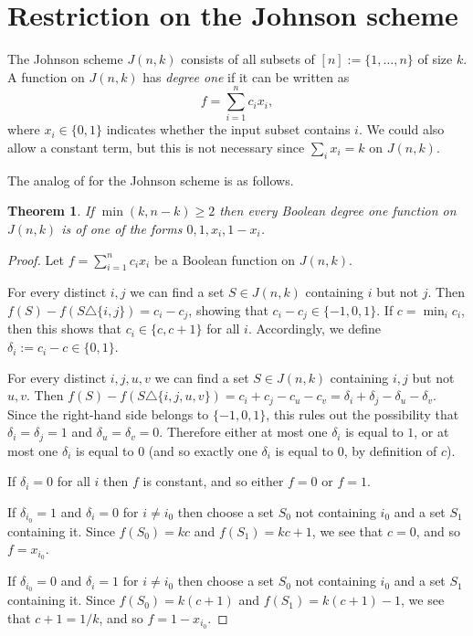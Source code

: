 \documentclass{article}
\newtheorem{theorem}{Theorem}[section]
\theoremstyle{definition}
\begin{document}
\appendix

\section{Restriction on the Johnson scheme}
\label{sec:restriction-johnson}

The Johnson scheme $J(n,k)$ consists of all subsets of $[n] := \{1,\dots,n\}$ of size $k$. A function on $J(n,k)$ has \emph{degree one} if it can be written as
\[
 f = \sum_{i=1}^n c_i x_i,
\]
where $x_i \in \{0,1\}$ indicates whether the input subset contains $i$.
We could also allow a constant term, but this is not necessary since $\sum_i x_i = k$ on $J(n,k)$.

The analog of  for the Johnson scheme is as follows.

\begin{theorem} \label{thm:main-johnson}
If $\min(k,n-k) \ge 2$ then every Boolean degree one function on $J(n,k)$ is of one of the forms $0, 1, x_i, 1-x_i$.    
\end{theorem}
\begin{proof}
Let $f = \sum_{i=1}^n c_i x_i$ be a Boolean function on $J(n,k)$.

For every distinct $i,j$ we can find a set $S \in J(n,k)$ containing $i$ but not $j$. Then $f(S) - f(S \triangle \{i,j\}) = c_i - c_j$, showing that $c_i - c_j \in \{-1,0,1\}$. If $c = \min_i c_i$, then this shows that $c_i \in \{c, c+1\}$ for all $i$. Accordingly, we define $\delta_i := c_i - c \in \{0,1\}$.

For every distinct $i,j,u,v$ we can find a set $S \in J(n,k)$ containing $i,j$ but not $u,v$. Then $f(S) - f(S \triangle \{i,j,u,v\}) = c_i + c_j - c_u - c_v = \delta_i + \delta_j - \delta_u - \delta_v$. Since the right-hand side belongs to $\{-1,0,1\}$, this rules out the possibility that $\delta_i=\delta_j=1$ and $\delta_u=\delta_v=0$. Therefore either at most one $\delta_i$ is equal to $1$, or at most one $\delta_i$ is equal to $0$ (and so exactly one $\delta_i$ is equal to $0$, by definition of $c$).

If $\delta_i = 0$ for all $i$ then $f$ is constant, and so either $f = 0$ or $f = 1$.

If $\delta_{i_0} = 1$ and $\delta_i = 0$ for $i \neq i_0$ then choose a set $S_0$ not containing $i_0$ and a set $S_1$ containing it. Since $f(S_0) = kc$ and $f(S_1) = kc+1$, we see that $c = 0$, and so $f = x_{i_0}$.

If $\delta_{i_0} = 0$ and $\delta_i = 1$ for $i \neq i_0$ then choose a set $S_0$ not containing $i_0$ and a set $S_1$ containing it. Since $f(S_0) = k(c+1)$ and $f(S_1) = k(c+1)-1$, we see that $c+1 = 1/k$, and so $f = 1 - x_{i_0}$.
\end{proof}
\end{document}
